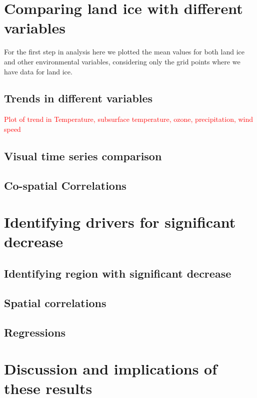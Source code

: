 \documentclass[../main.tex]{subfiles}
\begin{document}
\section{Comparing land ice with different variables}
For the first step in analysis here we plotted the mean values for both land ice and other environmental variables, considering only the grid points where we have data for land ice.

\subsection{Trends in different variables}
\textcolor{red}{Plot of trend in Temperature, subsurface temperature, ozone, precipitation, wind speed}

\subsection{Visual time series comparison}

\subsection{Co-spatial Correlations}

\section{Identifying drivers for significant decrease}

\subsection{Identifying region with significant decrease}

\subsection{Spatial correlations}

\subsection{Regressions}

\section{Discussion and implications of these results}
\end{document}
